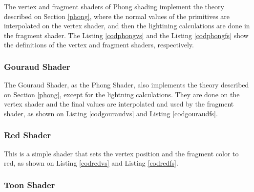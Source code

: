 \documentclass[10pt, conference, compsocconf]{IEEEtran}
\begin{document}
{The vertex and fragment shaders of Phong shading implement the theory described on Section \ref{phong}, where the normal values of the primitives are interpolated on the vertex shader,
 and then the lightining calculations are done in the fragment shader. The Listing \ref{codphongvs} and the Listing \ref{codphongfs} show the definitions of the vertex and fragment shaders, respectively.  

	

	

\subsubsection{Gouraud Shader}

The Gouraud Shader, as the Phong Shader, also implements the theory described on Section \ref{phong}, except for the lightning calculations. 
They are done on the vertex shader and the final values are interpolated and used by the fragment shader, as shown on Listing \ref{codgouraudvs} and Listing \ref{codgouraudfs}. 

	

	

\subsubsection{Red Shader}
	
	This is a simple shader that sets the vertex position and the fragment color to red, as shown on Listing \ref{codredvs} and Listing \ref{codredfs}. 
	
	
	
	

\subsubsection{Toon Shader}

}
\end{document}
